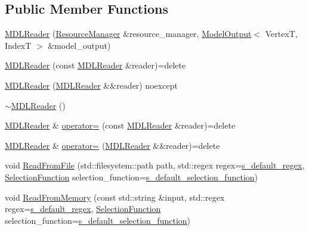\subsection*{Public Member Functions}
\begin{DoxyCompactItemize}
\item 
\mbox{\hyperlink{classmage_1_1rendering_1_1loader_1_1_m_d_l_reader_acc6d10b858b43608cb22d9086ae227fd}{M\+D\+L\+Reader}} (\mbox{\hyperlink{classmage_1_1rendering_1_1_resource_manager}{Resource\+Manager}} \&resource\+\_\+manager, \mbox{\hyperlink{structmage_1_1rendering_1_1_model_output}{Model\+Output}}$<$ VertexT, IndexT $>$ \&model\+\_\+output)
\item 
\mbox{\hyperlink{classmage_1_1rendering_1_1loader_1_1_m_d_l_reader_a98d83bb5d8cec2b8e665f08bc50068f6}{M\+D\+L\+Reader}} (const \mbox{\hyperlink{classmage_1_1rendering_1_1loader_1_1_m_d_l_reader}{M\+D\+L\+Reader}} \&reader)=delete
\item 
\mbox{\hyperlink{classmage_1_1rendering_1_1loader_1_1_m_d_l_reader_a77f5be43642636faf71e7fb3eed7e050}{M\+D\+L\+Reader}} (\mbox{\hyperlink{classmage_1_1rendering_1_1loader_1_1_m_d_l_reader}{M\+D\+L\+Reader}} \&\&reader) noexcept
\item 
\mbox{\hyperlink{classmage_1_1rendering_1_1loader_1_1_m_d_l_reader_a2f4c6bd8c2ef49180538ddfe5530e230}{$\sim$\+M\+D\+L\+Reader}} ()
\item 
\mbox{\hyperlink{classmage_1_1rendering_1_1loader_1_1_m_d_l_reader}{M\+D\+L\+Reader}} \& \mbox{\hyperlink{classmage_1_1rendering_1_1loader_1_1_m_d_l_reader_a76e89824650cdf1d737048ac06862166}{operator=}} (const \mbox{\hyperlink{classmage_1_1rendering_1_1loader_1_1_m_d_l_reader}{M\+D\+L\+Reader}} \&reader)=delete
\item 
\mbox{\hyperlink{classmage_1_1rendering_1_1loader_1_1_m_d_l_reader}{M\+D\+L\+Reader}} \& \mbox{\hyperlink{classmage_1_1rendering_1_1loader_1_1_m_d_l_reader_a2afa24fc79ecdcf15f0cbf09f7a78e52}{operator=}} (\mbox{\hyperlink{classmage_1_1rendering_1_1loader_1_1_m_d_l_reader}{M\+D\+L\+Reader}} \&\&reader)=delete
\item 
void \mbox{\hyperlink{classmage_1_1rendering_1_1loader_1_1_m_d_l_reader_aba8857b3d0f49250e312bd737d7d0e9c}{Read\+From\+File}} (std\+::filesystem\+::path path, std\+::regex regex=\mbox{\hyperlink{classmage_1_1_line_reader_a6713da665d123ab39293c0c5a4e8e1de}{s\+\_\+default\+\_\+regex}}, \mbox{\hyperlink{classmage_1_1_line_reader_a17bbae61a3ce30bdb251d6c76e1a4522}{Selection\+Function}} selection\+\_\+function=\mbox{\hyperlink{classmage_1_1_line_reader_a93da10f6f69b44accfec8074712f35de}{s\+\_\+default\+\_\+selection\+\_\+function}})
\item 
void \mbox{\hyperlink{classmage_1_1rendering_1_1loader_1_1_m_d_l_reader_a6411d017fe1c7f30a544e2f0176f14a2}{Read\+From\+Memory}} (const std\+::string \&input, std\+::regex regex=\mbox{\hyperlink{classmage_1_1_line_reader_a6713da665d123ab39293c0c5a4e8e1de}{s\+\_\+default\+\_\+regex}}, \mbox{\hyperlink{classmage_1_1_line_reader_a17bbae61a3ce30bdb251d6c76e1a4522}{Selection\+Function}} selection\+\_\+function=\mbox{\hyperlink{classmage_1_1_line_reader_a93da10f6f69b44accfec8074712f35de}{s\+\_\+default\+\_\+selection\+\_\+function}})
\end{DoxyCompactItemize}
